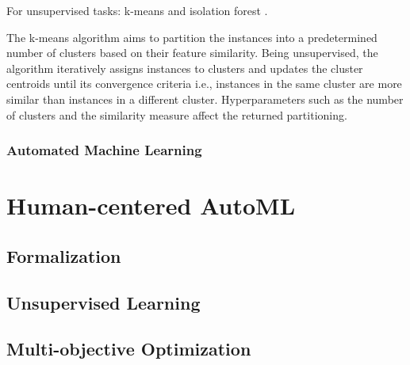 \documentclass[a4paper,12pt,times,numbered,print,index]{Classes/PhDThesisPSnPDF}
\begin{document}
For unsupervised tasks: k-means \cite{} and isolation forest \cite{}.

\begin{example}[K-Means]
    The k-means algorithm aims to partition the instances into a predetermined number of clusters based on their feature similarity.
    Being unsupervised, the algorithm iteratively assigns instances to clusters and updates the cluster centroids until its convergence criteria i.e., instances in the same cluster are more similar than instances in a different cluster.
    Hyperparameters such as the number of clusters and the similarity measure affect the returned partitioning.
\end{example}

\section{Automated Machine Learning}\label{automl-background-sec:automl}





\part{Human-centered AutoML}\label{part:automl}


\chapter{Formalization}\label{automl-chap:formalization}

% 

% 
% 
% 


\chapter{Unsupervised Learning}
\label{automl-chap:unsupervised}

\chapter{Multi-objective Optimization}
\label{automl-chap:moo}
\end{document}
